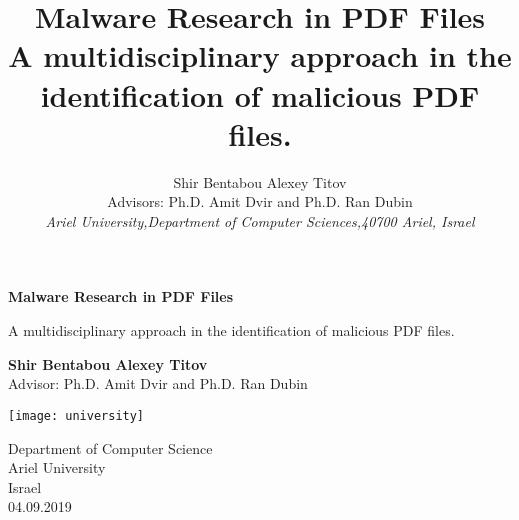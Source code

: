 \documentclass{article}
\title{\textbf{Malware Research in PDF Files\\ {\normalsize A multidisciplinary approach in the identification of malicious PDF files.}}}
\author{Shir Bentabou \qquad Alexey Titov\\
		{\normalsize Advisors: Ph.D. Amit Dvir and Ph.D. Ran Dubin}\\
		{\small{\textit{Ariel University,Department of Computer Sciences,40700 Ariel, Israel}}}}
\date{}
\begin{document}
\renewcommand{\thepage}{\arabic{page}}%
\pagecolor{yellow!20}
\begin{titlepage}
    \begin{center}
        \vspace*{1cm}
 
        \Huge
        \textbf{Malware Research in PDF Files}
 
        \vspace{0.5cm}
        \LARGE
        A multidisciplinary approach in the identification of malicious PDF files.
 
        \vspace{1.5cm}
 
        \textbf{Shir Bentabou \qquad Alexey Titov}
        \\
        Advisor: Ph.D. Amit Dvir and Ph.D. Ran Dubin
        \vfill
 
        \vspace{0.8cm}
 
        \texttt{[image: university]}
 
        \Large
        Department of Computer Science\\
        Ariel University\\
        Israel\\
        04.09.2019
 
    \end{center}
\end{titlepage}
\end{document}
